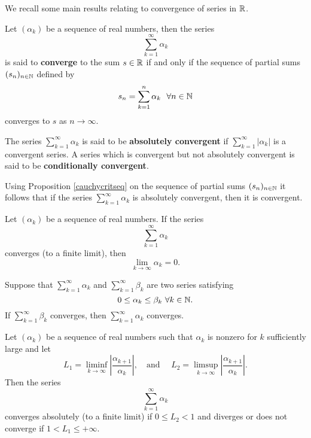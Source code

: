 \bigskip


We recall some main results relating to convergence of series in $\mathbb{R}$.
\bigskip
\begin{definition}
	Let $(\alpha_k)$ be a sequence of real numbers, then the series 
	$$
	\sum_{k=1}^\infty \alpha_k
	$$
	is said to \textbf{converge} to the sum $s\in\mathbb{R}$ if and only if  the sequence of partial sums $(s_n)_{n\in \mathbb{N}}$ defined by 
	$$
	s_n=\sum_{k=1}^{n} \alpha _k \ \ \forall n\in\mathbb{N}
	$$ 
	converges to $s$ as $n\rightarrow\infty$.
	
	
	\noindent The series  $\sum_{k=1}^\infty \alpha_k$ is said to be \textbf{absolutely convergent} if $\sum_{k=1}^\infty |\alpha_k|$ is a convergent series. A series which is convergent but not absolutely convergent is said to be \textbf{conditionally convergent}.
\end{definition}

\bigskip
\begin{remark}
Using Proposition \ref{cauchycritseq} on the sequence of partial sums $(s_n)_{n\in\mathbb{N}}$ it follows that	if the series $\sum_{k=1}^{\infty}\alpha _k$ is absolutely convergent, then it is convergent. 
\end{remark}

\bigskip
\begin{theorem}
	Let $(\alpha_k)$ be a sequence of real numbers. If the series 
	$$
	\sum_{k=1}^\infty \alpha_k
	$$
	converges (to a finite limit), then 
	$$
	\lim_{k\to \infty} \alpha_k =0.
	$$
\end{theorem}

\bigskip

\begin{theorem}
	Suppose that $\sum_{k=1}^{\infty}\alpha _k$ and $\sum_{k=1}^{\infty}\beta _k$ are two series satisfying
	$$
	0\leq \alpha_k\leq \beta _k \, \, \forall k\in\mathbb{N}.
	$$
	If $\sum_{k=1}^{\infty}\beta _k$ converges, then $\sum_{k=1}^{\infty}\alpha _k$ converges.
\end{theorem}

\bigskip



\begin{theorem}
Let $(\alpha_k)$ be a sequence of real numbers such that $\alpha_k$ is nonzero for $k$ sufficiently large and let
$$
L_1 = \liminf_{k\to \infty}\left| \frac{\alpha_{k+1}}{\alpha_k}\right|, \quad \text{and } \quad L_2 = \limsup_{k\to \infty}\left| \frac{\alpha_{k+1}}{\alpha_k}\right|.
$$
Then the series 
$$
\sum_{k=1}^\infty \alpha_k
$$
converges absolutely (to a finite limit) if $0\leq L_2<1$ and diverges or does not converge if $1< L_1\leq +\infty$.
\end{theorem}


